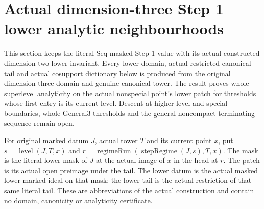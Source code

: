 \section{Actual dimension-three Step 1 lower analytic neighbourhoods}

This section keeps the literal Seq masked Step 1 value with its actual
constructed dimension-two lower invariant. Every lower domain, actual
restricted canonical tail and actual cosupport dictionary below is produced
from the original dimension-three domain and genuine canonical tower.
The result proves whole-superlevel analyticity on the actual nonspecial
point's lower patch for thresholds whose first entry is its current level.
Descent at higher-level and special boundaries, whole General3 thresholds
and the general noncompact terminating sequence remain open.

\begin{definition}
\label{hir:dimension-three-literal-lower-patch}
\leanok
For original marked datum $J$, actual tower $T$ and its current point $x$,
put $s=\operatorname{level}(J,T,x)$ and
$r=\operatorname{regimeRun}(\operatorname{stepRegime}(J,s),T,x)$.
The mask is the literal lower mask of $J$ at the actual image of $x$ in
the head at $r$. The patch is its actual open preimage under the tail.
The lower datum is the actual masked lower marked ideal on that mask;
the lower tail is the actual restriction of that same literal tail.
These are abbreviations of the actual construction and contain no
domain, canonicity or analyticity certificate.
\end{definition}

